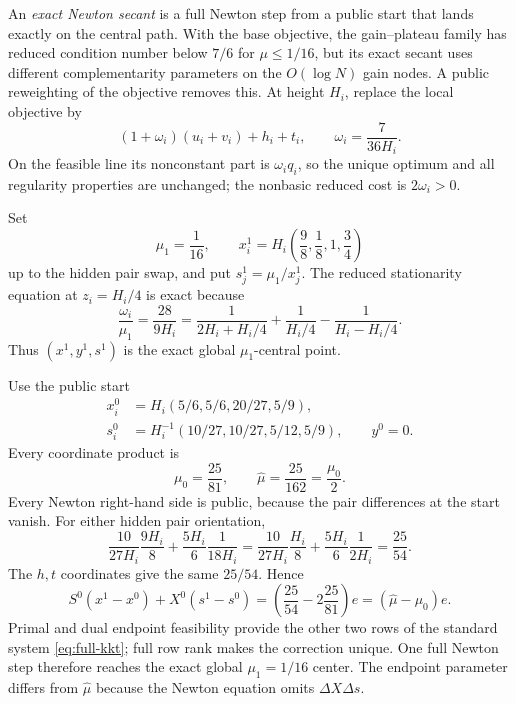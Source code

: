 An \emph{exact Newton secant} is a full Newton step from a public start
that lands exactly on the central path.  With the base objective, the
gain--plateau family has reduced condition number below \(7/6\) for
\(\mu\leq1/16\), but its exact secant uses different complementarity
parameters on the \(O(\log N)\) gain nodes.  A public reweighting of the
objective removes this.  At height \(H_i\), replace
the local objective by
\begin{equation}
 (1+\omega_i)(u_i+v_i)+h_i+t_i,
 \qquad \omega_i=\frac7{36H_i}.
\end{equation}
On the feasible line its nonconstant part is \(\omega_iq_i\), so the unique
optimum and all regularity properties are unchanged; the nonbasic reduced cost is
\(2\omega_i>0\).

Set
\begin{equation}
 \mu_1=\frac1{16},\qquad
 x_i^1=H_i\left(\frac98,\frac18,1,\frac34\right)
\label{eq:lp-tag-9-33}
\end{equation}
up to the hidden pair swap, and put \(s_j^1=\mu_1/x_j^1\).  The reduced
stationarity equation at \(z_i=H_i/4\) is exact because
\begin{equation}
 \frac{\omega_i}{\mu_1}=\frac{28}{9H_i}
 =\frac1{2H_i+H_i/4}+\frac1{H_i/4}-\frac1{H_i-H_i/4}.
\end{equation}
Thus \((x^1,y^1,s^1)\) is the exact global \(\mu_1\)-central point.

Use the public start
\begin{equation}
\begin{split}
 x_i^0&=H_i(5/6,5/6,20/27,5/9),\\
 s_i^0&=H_i^{-1}(10/27,10/27,5/12,5/9),\qquad y^0=0.
\end{split}
\label{eq:lp-tag-9-35}
\end{equation}
Every coordinate product is
\begin{equation}
 \mu_0=\frac{25}{81},\qquad
 \widehat\mu=\frac{25}{162}=\frac{\mu_0}{2}.
\end{equation}
Every Newton right-hand side is public, because the pair differences at the
start vanish.  For either hidden pair orientation,
\begin{equation}
 \frac{10}{27H_i}\frac{9H_i}{8}
 +\frac{5H_i}{6}\frac1{18H_i}
 =\frac{10}{27H_i}\frac{H_i}{8}
 +\frac{5H_i}{6}\frac1{2H_i}
 =\frac{25}{54}.
\label{eq:lp-tag-9-37}
\end{equation}
The \(h,t\) coordinates give the same \(25/54\).  Hence
\begin{equation}
 S^0(x^1-x^0)+X^0(s^1-s^0)
 =\left(\frac{25}{54}-2\frac{25}{81}\right)e
 =(\widehat\mu-\mu_0)e.
\label{eq:lp-tag-9-38}
\end{equation}
Primal and dual endpoint feasibility provide the other two rows of the
standard system \eqref{eq:full-kkt}; full row rank makes the correction
unique.  One full Newton step therefore reaches the exact global
\(\mu_1=1/16\) center.  The endpoint parameter differs from
\(\widehat\mu\) because the Newton equation omits
\(\Delta X\Delta s\).

